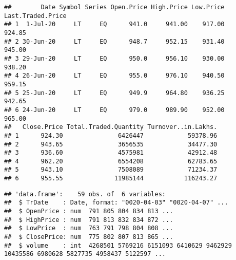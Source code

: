 \documentclass[
]{article}
\newenvironment{Shaded}{\begin{snugshade}}{\end{snugshade}}
\newcommand{\DataTypeTok}[1]{\textcolor[rgb]{0.13,0.29,0.53}{#1}}
\newcommand{\DecValTok}[1]{\textcolor[rgb]{0.00,0.00,0.81}{#1}}
\newcommand{\KeywordTok}[1]{\textcolor[rgb]{0.13,0.29,0.53}{\textbf{#1}}}
\newcommand{\NormalTok}[1]{#1}
\newcommand{\OperatorTok}[1]{\textcolor[rgb]{0.81,0.36,0.00}{\textbf{#1}}}
\newcommand{\StringTok}[1]{\textcolor[rgb]{0.31,0.60,0.02}{#1}}
\begin{document}
\begin{verbatim}
##        Date Symbol Series Open.Price High.Price Low.Price Last.Traded.Price
## 1  1-Jul-20     LT     EQ      941.0     941.00    917.00            924.85
## 2 30-Jun-20     LT     EQ      948.7     952.15    931.40            945.00
## 3 29-Jun-20     LT     EQ      950.0     956.10    930.00            938.20
## 4 26-Jun-20     LT     EQ      955.0     976.10    940.50            959.15
## 5 25-Jun-20     LT     EQ      949.9     964.80    936.25            942.65
## 6 24-Jun-20     LT     EQ      979.0     989.90    952.00            965.00
##   Close.Price Total.Traded.Quantity Turnover..in.Lakhs.
## 1      924.30               6426447            59378.96
## 2      943.65               3656535            34477.30
## 3      936.60               4575981            42912.48
## 4      962.20               6554208            62783.65
## 5      943.10               7508089            71234.37
## 6      955.55              11985144           116243.27
\end{verbatim}

\begin{Shaded}
\end{Shaded}

\begin{verbatim}
## 'data.frame':    59 obs. of  6 variables:
##  $ TrDate    : Date, format: "0020-04-03" "0020-04-07" ...
##  $ OpenPrice : num  791 805 804 834 813 ...
##  $ HighPrice : num  791 813 832 834 872 ...
##  $ LowPrice  : num  763 791 798 804 808 ...
##  $ ClosePrice: num  775 802 807 813 865 ...
##  $ volume    : int  4268501 5769216 6151093 6410629 9462929 10435586 6980628 5827735 4958437 5122597 ...
\end{verbatim}
\end{document}
